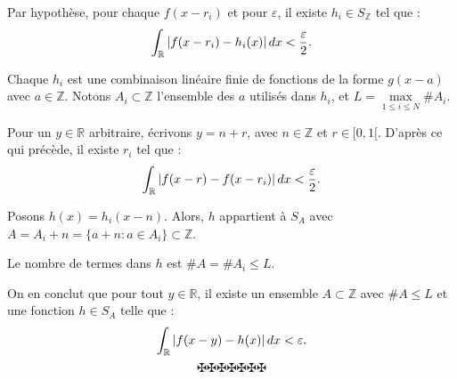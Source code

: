 Par hypoth{\`e}se, pour chaque $f (x - r_i)$ et pour $\varepsilon$, il existe
$h_i \in S_{\mathbb{Z}}$ tel que :
\[ \int_{\mathbb{R}} |f (x - r_i) - h_i (x) |  \hspace{0.17em} dx <
   \frac{\varepsilon}{2} . \]


Chaque $h_i$ est une combinaison lin{\'e}aire finie de fonctions de la forme
$g (x - a)$ avec $a \in \mathbb{Z}$. Notons $A_i \subset \mathbb{Z}$
l'ensemble des $a$ utilis{\'e}s dans $h_i$, et $L = \underset{1 \leq i \leq
N}{\max} \#A_i$.

Pour un $y \in \mathbb{R}$ arbitraire, {\'e}crivons $y = n + r$, avec $n \in
\mathbb{Z}$ et $r \in [0, 1 [$. D'apr{\`e}s ce qui pr{\'e}c{\`e}de, il existe
$r_i$ tel que :
\[ \int_{\mathbb{R}} |f (x - r) - f (x - r_i) |  \hspace{0.17em} dx <
   \frac{\varepsilon}{2} . \]


Posons $h (x) = h_i  (x - n)$. Alors, $h$ appartient {\`a} $S_A$ avec $A = A_i
+ n = \{a + n : a \in A_i \} \subset \mathbb{Z}$.

Le nombre de termes dans $h$ est $\#A =\#A_i \leq L$.

On en conclut que pour tout $y \in \mathbb{R}$, il existe un ensemble $A
\subset \mathbb{Z}$ avec $\#A \leq L$ et une fonction $h \in S_A$ telle que :
\[ \int_{\mathbb{R}} |f (x - y) - h (x) |  \hspace{0.17em} dx < \varepsilon .
\]
\[ \maltese \maltese \maltese \maltese \maltese \maltese \maltese \]

